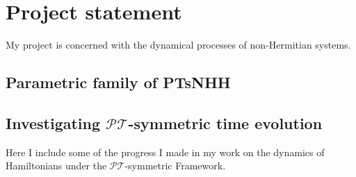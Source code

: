 \documentclass[12pt, a4paper]{report}
\newcommand\PT{\(\mathcal{PT}\)}
\begin{document}
\chapter{Project statement}\label{mine}
My project is concerned with the dynamical processes of non-Hermitian systems.



\section{Parametric family of PTsNHH}\label{}




\section{Investigating \PT-symmetric time evolution}
Here I include some of the progress I made in my work on the dynamics of Hamiltonians under the \PT-symmetric Framework. 
\end{document}
